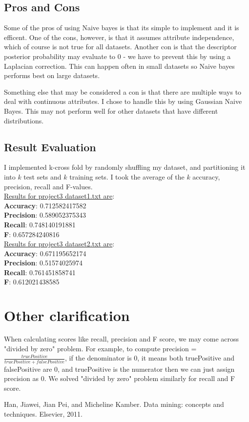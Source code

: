 \documentclass[paper=letter, fontsize=11pt]{article}
\numberwithin{equation}{section}		%
\numberwithin{figure}{section}			%
\numberwithin{table}{section}				%
\begin{document}
\subsection{Pros and Cons}
Some of the pros of using Naive bayes is that its simple to implement and it is efficent. One of the cons, however, is that it assumes attribute independence, which of course is not true for all datasets. Another con is that the descriptor posterior probability may evaluate to 0 - we have to prevent this by using a Laplacian correction. This can happen often in small datasets so Naive bayes performs best on large datasets. 

\noindent Something else that may be considered a con is that there are multiple ways to deal with continuous attributes. I chose to handle this by using Gaussian Naive Bayes. This may not perform well for other datasets that have different distributions. 

\subsection{Result Evaluation}
I implemented k-cross fold by randomly shuffling my dataset, and partitioning it into $k$ test sets and $k$ training sets. I took the average of the $k$ accuracy, precision, recall and F-values. \\

\noindent \underline{Results for project3 dataset1.txt are}: \\ 
\textbf{Accuracy}: 0.712582417582\\
\textbf{Precision}: 0.589052375343\\
\textbf{Recall}: 0.748140191881\\
\textbf{F}: 0.657284240816\\

\noindent \underline{Results for project3 dataset2.txt are}:\\
\textbf{Accuracy}: 0.671195652174\\
\textbf{Precision}: 0.51574025974\\
\textbf{Recall}: 0.761451858741\\
\textbf{F}: 0.612021438585\\


\section{Other clarification}
When calculating scores like recall, precision and F score, we may come across "divided by zero" problem. For example, to compute precision = $  \frac{truePositive}{truePositive + falsePositive}$, if the denominator is 0, it means both truePositive and falsePositive are 0, and truePositive is the numerator then we can just assign precision as 0. We solved "divided by zero" problem similarly for recall and F score.
 \begin{thebibliography}{1}
 Han, Jiawei, Jian Pei, and Micheline Kamber. Data mining: concepts and techniques. Elsevier, 2011.
 \end{thebibliography}
\end{document}
